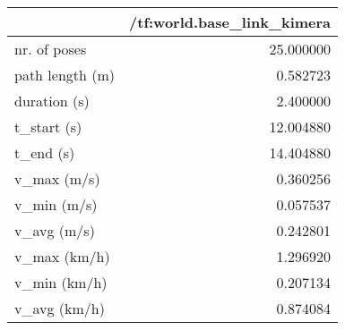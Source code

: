 \begin{tabular}{lr}
\toprule
{} &  /tf:world.base\_link\_kimera \\
\midrule
nr. of poses    &                   25.000000 \\
path length (m) &                    0.582723 \\
duration (s)    &                    2.400000 \\
t\_start (s)     &                   12.004880 \\
t\_end (s)       &                   14.404880 \\
v\_max (m/s)     &                    0.360256 \\
v\_min (m/s)     &                    0.057537 \\
v\_avg (m/s)     &                    0.242801 \\
v\_max (km/h)    &                    1.296920 \\
v\_min (km/h)    &                    0.207134 \\
v\_avg (km/h)    &                    0.874084 \\
\bottomrule
\end{tabular}
